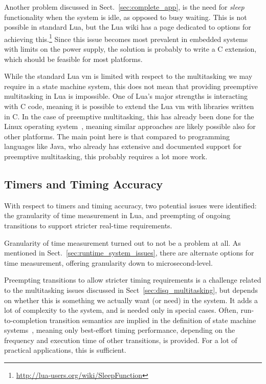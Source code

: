 Another problem discussed in Sect.~\ref{sec:complete_app}, is the need for \emph{sleep} functionality when the system is idle, as opposed to busy waiting. This is not possible in standard Lua, but the Lua wiki has a page dedicated to options for achieving this.\footnote{\url{http://lua-users.org/wiki/SleepFunction}} Since this issue becomes most prevalent in embedded systems with limits on the power supply, the solution is probably to write a C extension, which should be feasible for most platforms.

While the standard Lua \gls{vm} is limited with respect to the multitasking we may require in a state machine system, this does not mean that providing preemptive multitasking in Lua is impossible. One of Lua's major strengths is interacting with C code, meaning it is possible to extend the Lua \gls{vm} with libraries written in C. In the case of preemptive multitasking, this has already been done for the Linux operating system~\cite{techreport:lua_concurrent}, meaning similar approaches are likely possible also for other platforms. The main point here is that compared to programming languages like Java, who already has extensive and documented support for preemptive multitasking, this probably requires a lot more work.

\subsection{Timers and Timing Accuracy}
\label{sec:disq_timers}
With respect to timers and timing accuracy, two potential issues were identified: the granularity of time measurement in Lua, and preempting of ongoing transitions to support stricter real-time requirements.

Granularity of time measurement turned out to not be a problem at all. As mentioned in Sect.~\ref{sec:runtime_system_issues}, there are alternate options for time measurement, offering granularity down to microsecond-level.

Preempting transitions to allow stricter timing requirements is a challenge related to the multitasking issues discussed in Sect~\ref{sec:disq_multitasking}, but depends on whether this is something we actually want (or need) in the system. It adds a lot of complexity to the system, and is needed only in special cases. Often, run-to-completion transition semantics are implied in the definition of state machine systems~\cite{techreport:uml_state_machines}, meaning only best-effort timing performance, depending on the frequency and execution time of other transitions, is provided. For a lot of practical applications, this is sufficient.


